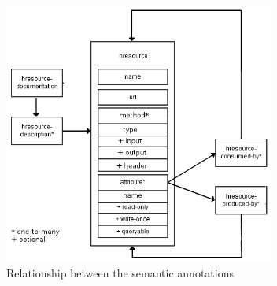 \documentclass[journal]{IEEEtran}
\begin{document}
\begin{figure}[!t]
    \centering
    \includegraphics[width=3.5in]{images/rel_semantic.png}
    \caption{Relationship between the semantic annotations}
    \label{fig:rel_semantic}
\end{figure}
\end{document}
